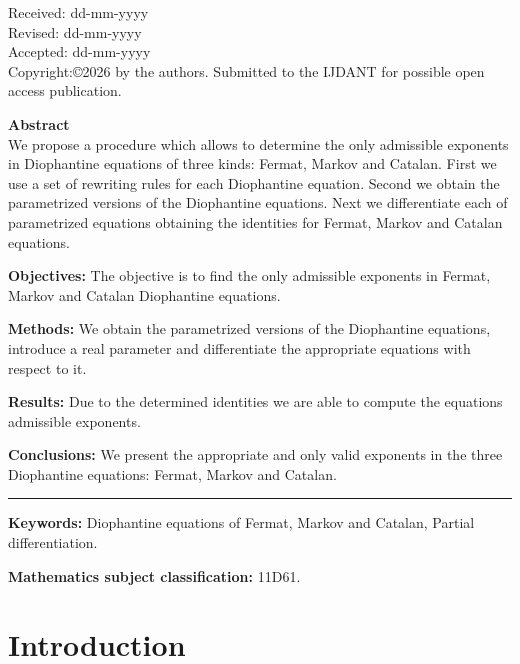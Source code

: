 \documentclass[11pt]{article}
\begin{document}
\noindent
\begin{minipage}[t]{0.32\textwidth}
Received: dd-mm-yyyy\\
Revised: dd-mm-yyyy\\
Accepted: dd-mm-yyyy
\\
{\small Copyright:©2026 by the authors.
Submitted to the IJDANT for possible open access
publication.}
\end{minipage}
\hfill
\begin{minipage}[t]{0.65\textwidth} 

\textbf{Abstract}\\
We propose a procedure which allows to determine the only admissible exponents
in Diophantine equations of three kinds: Fermat, Markov and Catalan.
First we use a set of rewriting rules for each Diophantine equation.
Second we obtain the parametrized versions of the Diophantine equations. 
Next we differentiate each of parametrized equations obtaining the identities
for Fermat, Markov and Catalan equations. 


\textbf{Objectives:} The objective is to find the only admissible exponents in Fermat, Markov
and Catalan Diophantine equations.

\textbf{Methods:} We obtain the parametrized versions of the Diophantine equations, introduce a real parameter
and differentiate the appropriate equations with respect to it.

\textbf{Results:} Due to the determined identities we are able
to compute the equations admissible exponents.

\textbf{Conclusions:} We present the appropriate and only valid exponents in the three Diophantine equations: Fermat, Markov and Catalan.

\vspace{1cm}
\hrule


\end{minipage}

\vspace{1cm}

\textbf{Keywords:} Diophantine equations of Fermat, Markov and Catalan, Partial differentiation.

\textbf{Mathematics subject classification:} 11D61.


\section{Introduction} \label{sec:Intr}
\end{document}
